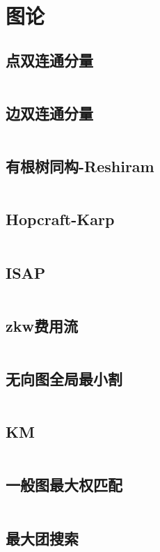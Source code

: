 \section{图论}
\subsection{点双连通分量}
\inputminted[breaklines]{cpp}{./graph-theory/vertex-biconnected-component.cpp}
\subsection{边双连通分量}
\inputminted[breaklines]{cpp}{./graph-theory/edge-biconnected-component.cpp}
\subsection{有根树同构-Reshiram}
\inputminted[breaklines]{cpp}{./graph-theory/rooted-tree-isomorphism-Reshiram.cpp}
\subsection{Hopcraft-Karp}
\inputminted[breaklines]{cpp}{./graph-theory/Hopcroft-Karp.cpp}
\subsection{ISAP}
\inputminted[breaklines]{cpp}{./graph-theory/ISAP-maximum-flow.cpp}
\subsection{zkw费用流}
\inputminted[breaklines]{cpp}{./graph-theory/zkw-cost-flow.cpp}
\subsection{无向图全局最小割}
\inputminted[breaklines]{cpp}{./graph-theory/StoerWagner.cpp}
\subsection{KM}
\inputminted[breaklines]{cpp}{./graph-theory/KM-Algorithm.cpp}
\subsection{一般图最大权匹配}
\inputminted[breaklines]{cpp}{./graph-theory/general-graph-maximum-weight-matching.cpp}
\subsection{最大团搜索}
\inputminted[breaklines]{cpp}{./graph-theory/maximum-clique.cpp}
